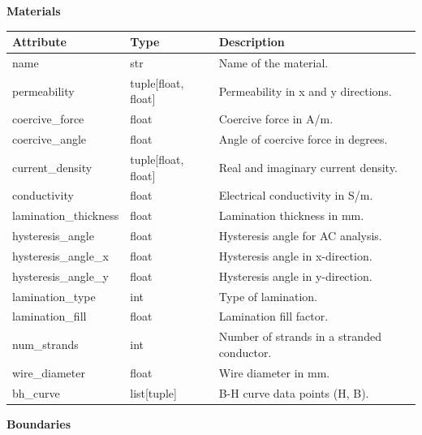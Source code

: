 \documentclass[11pt,a4paper]{article}
\begin{document}
\vspace{0.5cm}
\noindent\textbf{Materials}

\begin{table}[h]
  \centering
  \renewcommand{\arraystretch}{1.3}
  \footnotesize
  \begin{tabularx}{\textwidth}{>{\raggedright\arraybackslash}p{3.5cm} 
                  >{\raggedright\arraybackslash}p{2.5cm}
                  >{\raggedright\arraybackslash}X}
    \toprule
    \textbf{Attribute} & \textbf{Type} & \textbf{Description} \\
    \midrule
    name & str & Name of the material. \\
    permeability & tuple[float, float] & Permeability in x and y directions. \\
    coercive\_force & float & Coercive force in A/m. \\
    coercive\_angle & float & Angle of coercive force in degrees. \\
    current\_density & tuple[float, float] & Real and imaginary current density. \\
    conductivity & float & Electrical conductivity in S/m. \\
    lamination\_thickness & float & Lamination thickness in mm. \\
    hysteresis\_angle & float & Hysteresis angle for AC analysis. \\
    hysteresis\_angle\_x & float & Hysteresis angle in x-direction. \\
    hysteresis\_angle\_y & float & Hysteresis angle in y-direction. \\
    lamination\_type & int & Type of lamination. \\
    lamination\_fill & float & Lamination fill factor. \\
    num\_strands & int & Number of strands in a stranded conductor. \\
    wire\_diameter & float & Wire diameter in mm. \\
    bh\_curve & list[tuple] & B-H curve data points (H, B). \\
    \bottomrule
  \end{tabularx}
\end{table}

\newpage

\vspace{0.5cm}
\noindent\textbf{Boundaries}
\end{document}
